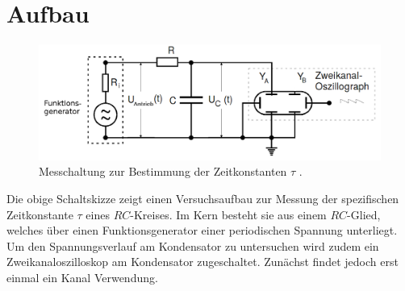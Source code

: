 \section{Aufbau}
\label{sec:Aufbau}


\begin{figure}[H]
 \centering
 \includegraphics[width=\linewidth-100pt,height=\textheight-100pt,keepaspectratio]{content/aufbau353.png}
 \caption{Messchaltung zur Bestimmung der Zeitkonstanten $\tau$ \cite{V353}.}
 \label{fig:Aufbaua}
\end{figure}
Die obige Schaltskizze zeigt einen Versuchsaufbau zur Messung der spezifischen
 Zeitkonstante $\tau$ eines $RC$-Kreises. Im Kern besteht sie aus einem $RC$-Glied, welches über einen
  Funktionsgenerator einer periodischen Spannung unterliegt. Um den
   Spannungsverlauf am Kondensator zu untersuchen wird zudem ein
    Zweikanaloszilloskop am Kondensator zugeschaltet. Zunächst findet jedoch
     erst einmal ein Kanal Verwendung.
